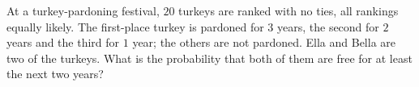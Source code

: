 At a turkey-pardoning festival, $20$ turkeys are ranked with no ties, all rankings equally likely. The first-place turkey is pardoned for $3$ years, the second for $2$ years and the third for $1$ year; the others are not pardoned. Ella and Bella are two of the turkeys. What is the probability that both of them are free for at least the next two years?

